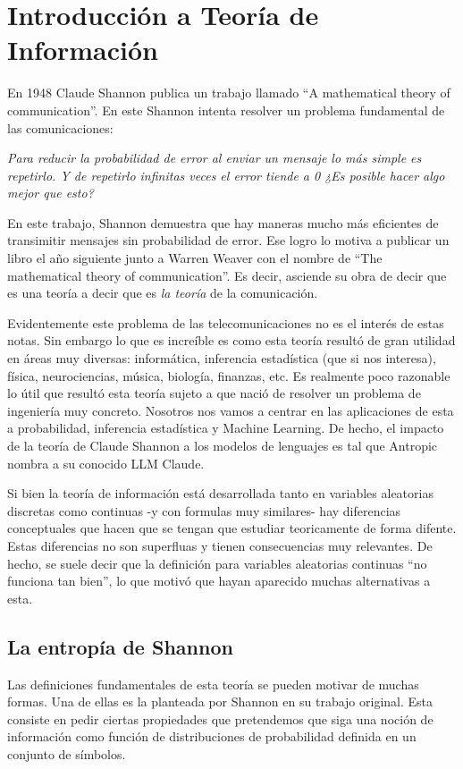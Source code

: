 
\chapter{Introducci\'on a Teor\'ia de Informaci\'on}
En 1948 Claude Shannon publica un trabajo llamado ``A mathematical theory of communication''. En este Shannon intenta resolver un problema fundamental de las comunicaciones: 
\begin{center}
    {\it
        Para reducir la probabilidad de error al enviar un mensaje lo m\'as simple es repetirlo. Y de repetirlo infinitas veces el error tiende a 0 ¿Es posible hacer algo mejor que esto?
    }
\end{center}
En este trabajo, Shannon demuestra que hay maneras mucho más eficientes de transimitir mensajes sin probabilidad de error. Ese logro lo motiva a publicar un libro el año siguiente junto a Warren Weaver con el nombre de ``The mathematical theory of communication''. Es decir, asciende su obra de decir que es una teor\'ia a decir que es {\it la teor\'ia} de la comunicaci\'on.

Evidentemente este problema de las telecomunicaciones no es el inter\'es de estas notas. Sin embargo lo que es increíble es como esta teoría resultó de gran utilidad en áreas muy diversas: informática, inferencia estadística (que si nos interesa), física, neurociencias, música, biología, finanzas, etc. Es realmente poco razonable lo \'util que result\'o esta teor\'ia sujeto a que naci\'o de resolver un problema de ingenier\'ia muy concreto. Nosotros nos vamos a centrar en las aplicaciones de esta a probabilidad, inferencia estad\'istica y Machine Learning. De hecho, el impacto de la teor\'ia de Claude Shannon a los modelos de lenguajes es tal que Antropic nombra a su conocido LLM Claude.

Si bien la teor\'ia de informaci\'on est\'a desarrollada tanto en variables aleatorias discretas como continuas -y con formulas muy similares- hay diferencias conceptuales que hacen que se tengan que estudiar teoricamente de forma difente. Estas diferencias no son superfluas y tienen consecuencias muy relevantes. De hecho, se suele decir que la definici\'on para variables aleatorias continuas ``no funciona tan bien'', lo que motiv\'o que hayan aparecido muchas alternativas a esta.
\section{La entrop\'ia de Shannon}
Las definiciones fundamentales de esta teoría se pueden motivar de muchas formas. Una de ellas es la planteada por Shannon en su trabajo original. Esta consiste en pedir ciertas propiedades que pretendemos que siga una noción de información como función de distribuciones de probabilidad definida en un conjunto de símbolos.

